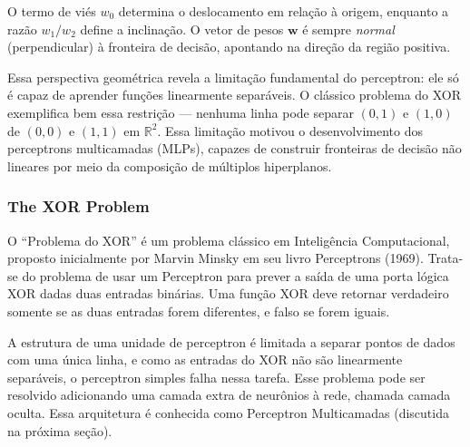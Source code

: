 \documentclass{article}
\begin{document}
O termo de viés $w_0$ determina o deslocamento em relação à origem, enquanto a razão $w_1/w_2$ define a inclinação. O vetor de pesos $\mathbf{w}$ é sempre \textit{normal} (perpendicular) à fronteira de decisão, apontando na direção da região positiva.

Essa perspectiva geométrica revela a limitação fundamental do perceptron: ele só é capaz de aprender funções linearmente separáveis. O clássico problema do XOR exemplifica bem essa restrição — nenhuma linha pode separar $(0,1)$ e $(1,0)$ de $(0,0)$ e $(1,1)$ em $\mathbb{R}^2$. Essa limitação motivou o desenvolvimento dos perceptrons multicamadas (MLPs), capazes de construir fronteiras de decisão não lineares por meio da composição de múltiplos hiperplanos.

\subsubsection{The XOR Problem}

O “Problema do XOR” é um problema clássico em Inteligência Computacional, proposto inicialmente por Marvin Minsky em seu livro Perceptrons (1969). Trata-se do problema de usar um Perceptron para prever a saída de uma porta lógica XOR dadas duas entradas binárias. Uma função XOR deve retornar verdadeiro somente se as duas entradas forem diferentes, e falso se forem iguais.

A estrutura de uma unidade de perceptron é limitada a separar pontos de dados com uma única linha, e como as entradas do XOR não são linearmente separáveis, o perceptron simples falha nessa tarefa. Esse problema pode ser resolvido adicionando uma camada extra de neurônios à rede, chamada camada oculta. Essa arquitetura é conhecida como Perceptron Multicamadas (discutida na próxima seção).
\end{document}
